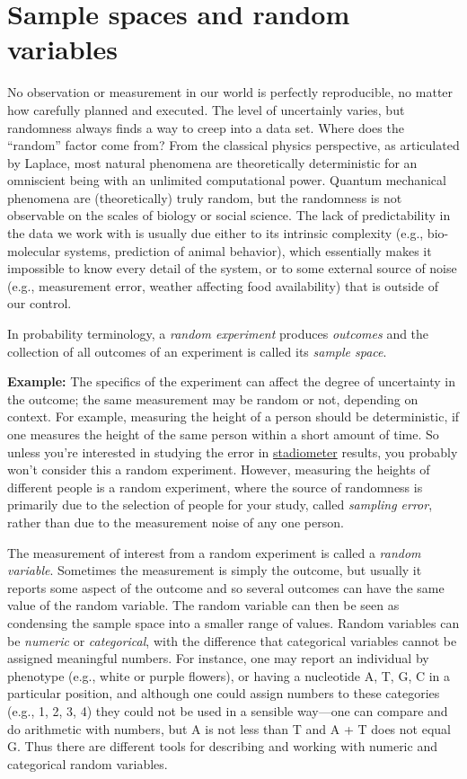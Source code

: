 \documentclass[
  letterpaper,
  DIV=11,
  numbers=noendperiod]{scrreprt}
\begin{document}
\hypertarget{sample-spaces-and-random-variables}{%
\section{Sample spaces and random
variables}\label{sample-spaces-and-random-variables}}

No observation or measurement in our world is perfectly reproducible, no
matter how carefully planned and executed. The level of uncertainly
varies, but randomness always finds a way to creep into a data set.
Where does the ``random'' factor come from? From the classical physics
perspective, as articulated by Laplace, most natural phenomena are
theoretically deterministic for an omniscient being with an unlimited
computational power. Quantum mechanical phenomena are (theoretically)
truly random, but the randomness is not observable on the scales of
biology or social science. The lack of predictability in the data we
work with is usually due either to its intrinsic complexity (e.g.,
bio-molecular systems, prediction of animal behavior), which essentially
makes it impossible to know every detail of the system, or to some
external source of noise (e.g., measurement error, weather affecting
food availability) that is outside of our control.

In probability terminology, a \emph{random experiment} produces
\emph{outcomes} and the collection of all outcomes of an experiment is
called its \emph{sample space}.

\textbf{Example:} The specifics of the experiment can affect the degree
of uncertainty in the outcome; the same measurement may be random or
not, depending on context. For example, measuring the height of a person
should be deterministic, if one measures the height of the same person
within a short amount of time. So unless you're interested in studying
the error in
\href{https://www.quickmedical.com/measure/stadiometer.html}{stadiometer}
results, you probably won't consider this a random experiment. However,
measuring the heights of different people is a random experiment, where
the source of randomness is primarily due to the selection of people for
your study, called \emph{sampling error}, rather than due to the
measurement noise of any one person.

The measurement of interest from a random experiment is called a
\emph{random variable}. Sometimes the measurement is simply the outcome,
but usually it reports some aspect of the outcome and so several
outcomes can have the same value of the random variable. The random
variable can then be seen as condensing the sample space into a smaller
range of values. Random variables can be \emph{numeric} or
\emph{categorical}, with the difference that categorical variables
cannot be assigned meaningful numbers. For instance, one may report an
individual by phenotype (e.g., white or purple flowers), or having a
nucleotide A, T, G, C in a particular position, and although one could
assign numbers to these categories (e.g., 1, 2, 3, 4) they could not be
used in a sensible way---one can compare and do arithmetic with numbers,
but A is not less than T and A + T does not equal G. Thus there are
different tools for describing and working with numeric and categorical
random variables.
\end{document}
